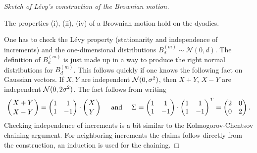 \begin{proof}[Sketch of L\'evy's construction of the Brownian motion]
	\begin{lstep}
		The properties (i), (ii), (iv) of a Brownian motion hold on the dyadics.
	\end{lstep}
	One has to check the L\'evy property (stationarity and independence of increments) and the one-dimensional distributions $B_d^{(m)}\sim\mathcal N(0,d)$. The definition of $B^{(m)}_d$ is just made up in a way to produce the right normal distributions for $B^{(m)}_d$. This follows quickly if one knows the following fact on Gaussian vectors. If $X,Y$ are independent $\mathcal{N}(0,\sigma^2)$, then $X+Y$, $X-Y$ are independent $\mathcal{N}(0,2\sigma^2)$. The fact follows from writing
	\begin{align*}
		\left(X+Y\atop X-Y\right)= \left(\begin{matrix}
			1 & 1 \\
			1 & -1 
			\end{matrix}\right)\cdot \left(X \atop Y\right)\quad \text{ and }\quad
		\Sigma=
		\left(\begin{matrix}
				1 & 1 \\
				1 & -1 
				\end{matrix}\right)\cdot
		 \left(\begin{matrix}
					1 & 1 \\
					1 & -1 
			\end{matrix}\right)^T =
			\left(\begin{matrix}
				2 & 0 \\
				0 & 2 
		\end{matrix}\right).
	\end{align*}
	Checking independence of increments is a bit similar to the Kolmogorov-Chentsov chaining argument. For neighboring increments the claims follow directly from the construction, an induction is used for the chaining. 

\end{proof}
